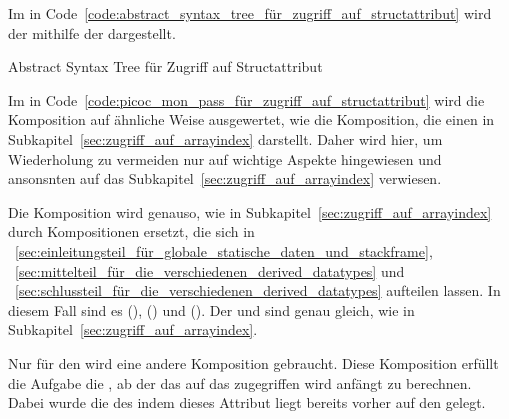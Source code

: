 Im  in Code~\ref{code:abstract_syntax_tree_für_zugriff_auf_structattribut} wird der   mithilfe der   dargestellt.

\begin{code}
  \centering
  \caption{Abstract Syntax Tree für Zugriff auf Structattribut}
  \label{code:abstract_syntax_tree_für_zugriff_auf_structattribut}
\end{code}

Im  in Code~\ref{code:picoc_mon_pass_für_zugriff_auf_structattribut} wird die Komposition  auf ähnliche Weise ausgewertet, wie die Komposition, die einen   in Subkapitel~\ref{sec:zugriff_auf_arrayindex} darstellt. Daher wird hier, um Wiederholung zu vermeiden nur auf wichtige Aspekte hingewiesen und ansonsnten auf das Subkapitel~\ref{sec:zugriff_auf_arrayindex} verwiesen.

Die Komposition  wird genauso, wie in Subkapitel~\ref{sec:zugriff_auf_arrayindex} durch Kompositionen ersetzt, die sich in ~\ref{sec:einleitungsteil_für_globale_statische_daten_und_stackframe}, ~\ref{sec:mittelteil_für_die_verschiedenen_derived_datatypes} und ~\ref{sec:schlussteil_für_die_verschiedenen_derived_datatypes} aufteilen lassen. In diesem Fall sind es  (),  () und  (). Der  und  sind genau gleich, wie in Subkapitel~\ref{sec:zugriff_auf_arrayindex}.

Nur für den  wird eine andere Komposition  gebraucht. Diese Komposition  erfüllt die Aufgabe die , ab der das  auf das zugegriffen wird anfängt zu berechnen. Dabei wurde die  des  indem dieses Attribut liegt bereits vorher auf den  gelegt.

